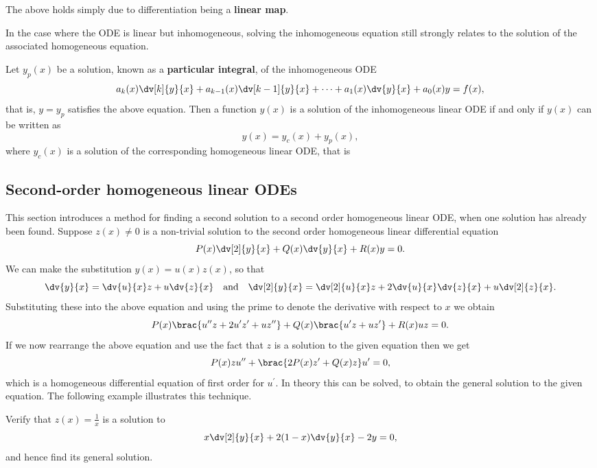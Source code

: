 The above holds simply due to differentiation being a \textbf{linear map}.

In the case where the ODE is linear but inhomogeneous, solving the inhomogeneous equation still strongly relates to the solution of the associated homogeneous equation.

\begin{theorem}
Let $y_p(x)$ be a solution, known as a \textbf{particular integral}, of the inhomogeneous ODE
\[a_k(x)\dv[k]{y}{x}+a_{k-1}(x)\dv[k-1]{y}{x}+\cdots+a_1(x)\dv{y}{x}+a_0(x)y=f(x),\]
that is, $y=y_p$ satisfies the above equation. Then a function $y(x)$ is a solution of the inhomogeneous linear ODE if and only if $y(x)$ can be written as
\[y(x)=y_c(x)+y_p(x),\]
where $y_c(x)$ is a solution of the corresponding homogeneous linear ODE, that is
\end{theorem}

\subsection{Second-order homogeneous linear ODEs}
This section introduces a method for finding a second solution to a second order homogeneous linear ODE, when one solution has already been found. Suppose $z(x)\neq0$ is a non-trivial solution to the second order homogeneous linear differential equation
\[ P(x)\dv[2]{y}{x}+Q(x)\dv{y}{x}+R(x)y=0. \]
We can make the substitution $y(x)=u(x)z(x)$, so that
\[ \dv{y}{x}=\dv{u}{x}z+u\dv{z}{x} \quad \text{and} \quad \dv[2]{y}{x}=\dv[2]{u}{x}z+2\dv{u}{x}\dv{z}{x}+u\dv[2]{z}{x}. \]
Substituting these into the above equation and using the prime to denote the derivative with respect to $x$ we obtain
\[ P(x)\brac{u^{\prime\prime}z+2u^\prime z^\prime+uz^{\prime\prime}}+Q(x)\brac{u^\prime z+uz^\prime}+R(x)uz=0. \]
If we now rearrange the above equation and use the fact that $z$ is a solution to the given equation then we get
\[ P(x)zu^{\prime\prime}+\brac{2P(x)z^\prime+Q(x)z}u^\prime=0, \]
which is a homogeneous differential equation of first order for $u^\prime$. In theory this can be solved, to obtain the general solution to the given equation. The following example illustrates this technique.

\begin{exercise}
Verify that $z(x)=\frac{1}{x}$ is a solution to
\[ x\dv[2]{y}{x}+2(1-x)\dv{y}{x}-2y=0, \]
and hence find its general solution.
\end{exercise}
\begin{solution}

\end{solution}



